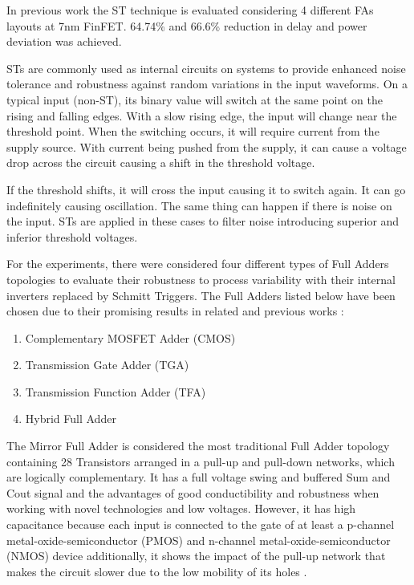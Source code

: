 \documentclass[pgmicro,mestrado,english]{iiufrgs}
\begin{document}
In previous work \cite{moraes2018evaluation} the ST technique is evaluated considering 4 different FAs layouts at 7nm FinFET. 64.74\% and 66.6\% reduction in delay and power deviation was achieved.

STs are commonly used as internal circuits on systems to provide enhanced noise tolerance and robustness against random variations in the input waveforms. On a typical input (non-ST), its binary value will switch at the same point on the rising and falling edges. With a slow rising edge, the input will change near the threshold point. When the switching occurs, it will require current from the supply source. With current being pushed from the supply, it can cause a voltage drop across the circuit causing a shift in the threshold voltage.

If the threshold shifts, it will cross the input causing it to switch again. It can go indefinitely causing oscillation. The same thing can happen if there is noise on the input. STs are applied in these cases to filter noise introducing superior and inferior threshold voltages.



For the experiments, there were considered four different types of Full Adders topologies to evaluate their robustness to process variability with their internal inverters replaced by Schmitt Triggers. The Full Adders listed below have been chosen due to their promising results in related and previous works \cite{ames2016investigating,dokania2015circuit,dokania2013investigation,moraes2018evaluation}:

\begin{enumerate}
    \item Complementary MOSFET Adder (CMOS)
    \item Transmission Gate Adder (TGA)
    \item Transmission Function Adder (TFA)
    \item Hybrid Full Adder
\end{enumerate}

The Mirror Full Adder is considered the most traditional Full Adder topology containing 28 Transistors arranged in a pull-up and pull-down networks, which are logically complementary. It has a full voltage swing and buffered Sum and Cout signal and the advantages of good conductibility and robustness when working with novel technologies and low voltages. However, it has high capacitance because each input is connected to the gate of at least a p-channel metal-oxide-semiconductor (PMOS) and n-channel metal-oxide-semiconductor (NMOS) device additionally, it shows the impact of the pull-up network that makes the circuit slower due to the low mobility of its holes \cite{beckett2002fine} \cite{devadas2017design} \cite{islam2011design}. 
\end{document}
